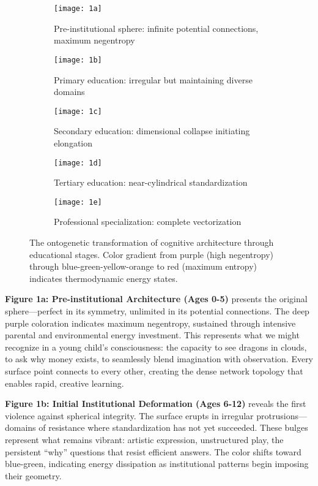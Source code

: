 \begin{figure}[htbp]
\centering
\begin{subfigure}[b]{0.18\textwidth}
    \centering
    \texttt{[image: 1a]}
    \caption{\small Pre-institutional sphere: infinite potential connections, maximum negentropy}
\end{subfigure}
\hfill
\begin{subfigure}[b]{0.18\textwidth}
    \centering
    \texttt{[image: 1b]}
    \caption{\small Primary education: irregular but maintaining diverse domains}
\end{subfigure}
\hfill
\begin{subfigure}[b]{0.18\textwidth}
    \centering
    \texttt{[image: 1c]}
    \caption{\small Secondary education: dimensional collapse initiating elongation}
\end{subfigure}
\hfill
\begin{subfigure}[b]{0.18\textwidth}
    \centering
    \texttt{[image: 1d]}
    \caption{\small Tertiary education: near-cylindrical standardization}
\end{subfigure}
\hfill
\begin{subfigure}[b]{0.18\textwidth}
    \centering
    \texttt{[image: 1e]}
    \caption{\small Professional specialization: complete vectorization}
\end{subfigure}
\caption{The ontogenetic transformation of cognitive architecture through educational stages. Color gradient from purple (high negentropy) through blue-green-yellow-orange to red (maximum entropy) indicates thermodynamic energy states.}
\label{fig:from-sphere-to-vector}
\end{figure}

\textbf{Figure 1a: Pre-institutional Architecture (Ages 0-5)} presents the original sphere---perfect in its symmetry, unlimited in its potential connections. The deep purple coloration indicates maximum negentropy, sustained through intensive parental and environmental energy investment. This represents what we might recognize in a young child's consciousness: the capacity to see dragons in clouds, to ask why money exists, to seamlessly blend imagination with observation. Every surface point connects to every other, creating the dense network topology that enables rapid, creative learning.

\textbf{Figure 1b: Initial Institutional Deformation (Ages 6-12)} reveals the first violence against spherical integrity. The surface erupts in irregular protrusions---domains of resistance where standardization has not yet succeeded. These bulges represent what remains vibrant: artistic expression, unstructured play, the persistent ``why'' questions that resist efficient answers. The color shifts toward blue-green, indicating energy dissipation as institutional patterns begin imposing their geometry.

